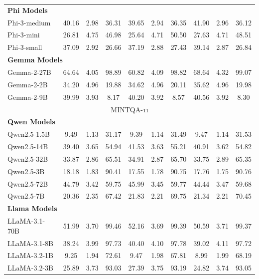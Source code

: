 \begin{table}[ht]
\begin{tabular}{l|ccc|ccc|ccc}
\hline
\multicolumn{10}{l}{\textbf{Phi Models}} \\
Phi\mbox{-}3\mbox{-}medium & 40.16 & 2.98 & 36.31 & 39.65 & 2.94 & 36.35 & 41.90 & 2.96 & 36.12 \\
Phi\mbox{-}3\mbox{-}mini& 26.81 & 4.75 & 46.98 & 25.64 & 4.71 & 50.50 & 27.63 & 4.71 & 48.51 \\
Phi\mbox{-}3\mbox{-}small & 37.09 & 2.92 & 26.66 & 37.19 & 2.88 & 27.43 & 39.14 & 2.87 & 26.84 \\
\hline
\multicolumn{10}{l}{\textbf{Gemma Models}} \\
Gemma\mbox{-}2\mbox{-}27B& 64.64 & 4.05 & 98.89 & 60.82 & 4.09 & 98.82 & 68.64 & 4.32 & 99.07 \\
Gemma\mbox{-}2\mbox{-}2B & 34.20 & 4.96 & 19.88 & 34.62 & 4.96 & 20.11 & 35.62 & 4.96 & 19.98 \\
Gemma\mbox{-}2\mbox{-}9B & 39.99 & 3.93 & 8.17 & 40.20 & 3.92 & 8.57 & 40.56 & 3.92 & 8.30 \\
\hline
\multicolumn{10}{c}{\textsc{MINTQA-ti}} \\
\hline
\multicolumn{10}{l}{\textbf{Qwen Models}} \\
Qwen2.5\mbox{-}1.5B & 9.49 & 1.13 & 31.17 & 9.39 & 1.14 & 31.49 & 9.47 & 1.14 & 31.53 \\
Qwen2.5\mbox{-}14B & 39.40 & 3.65 & 54.94 & 41.53 & 3.63 & 55.21 & 40.91 & 3.62 & 54.82 \\
Qwen2.5\mbox{-}32B & 33.87 & 2.86 & 65.51 & 34.91 & 2.87 & 65.70 & 33.75 & 2.89 & 65.35 \\
Qwen2.5\mbox{-}3B & 18.18 & 1.83 & 90.41 & 17.55 & 1.78 & 90.75 & 17.76 & 1.75 & 90.76 \\
Qwen2.5\mbox{-}72B & 44.79 & 3.42 & 59.75 & 45.99 & 3.45 & 59.77 & 44.44 & 3.47 & 59.68 \\
Qwen2.5\mbox{-}7B & 20.36 & 2.35 & 67.42 & 21.83 & 2.21 & 69.75 & 21.34 & 2.21 & 70.45 \\
\hline
\multicolumn{10}{l}{\textbf{Llama Models}} \\
LLaMA\mbox{-}3.1\mbox{-}70B & 51.99 & 3.70 & 99.46 & 52.16 & 3.69 & 99.39 & 50.59 & 3.71 & 99.37 \\
LLaMA\mbox{-}3.1\mbox{-}8B & 38.24 & 3.99 & 97.73 & 40.40 & 4.10 & 97.78 & 39.02 & 4.11 & 97.72 \\
LLaMA\mbox{-}3.2\mbox{-}1B & 9.25 & 1.94 & 72.61 & 9.47 & 1.98 & 67.81 & 8.99 & 1.99 & 68.19 \\
LLaMA\mbox{-}3.2\mbox{-}3B & 25.89 & 3.73 & 93.03 & 27.39 & 3.75 & 93.19 & 24.82 & 3.74 & 93.05 \\

\end{tabular}
\end{table}
